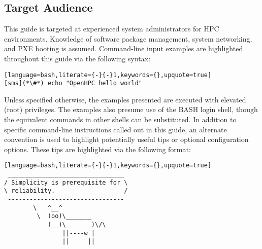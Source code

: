 \subsection{Target Audience}

This guide is targeted at experienced \Linux{} system administrators for HPC
environments. Knowledge of software package management, system networking, and
PXE booting is assumed. Command-line input examples are highlighted throughout
this guide via the following syntax:

\begin{lstlisting}[language=bash,literate={-}{-}1,keywords={},upquote=true]
[sms](*\#*) echo "OpenHPC hello world"
\end{lstlisting}

Unless specified otherwise, the examples presented are executed with
elevated (root) privileges. The examples also presume use of the BASH login
shell, though the equivalent commands in other shells can be substituted.
In addition to specific command-line instructions called out in this guide, an
alternate convention is used to highlight potentially useful tips or optional
configuration options. These tips are highlighted via the following format:

\begin{center}
\begin{tcolorbox}[]
\small
\begin{lstlisting}[language=bash,literate={-}{-}1,keywords={},upquote=true]
 ________________________________ 
/ Simplicity is prerequisite for \
\ reliability.                   /
 -------------------------------- 
        \   ^__^
         \  (oo)\_______
            (__)\       )\/\
                ||----w |
                ||     ||
\end{lstlisting}
\end{tcolorbox}
\end{center}

